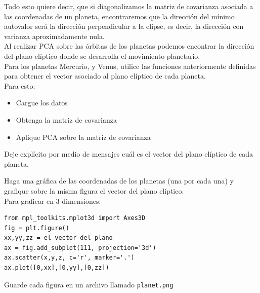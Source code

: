 \documentclass[11pt,letterpaper]{exam}
\begin{document}
\begin{questions}
Todo esto quiere decir, que si diagonalizamos la matriz de covarianza asociada a las coordenadas de un planeta, encontraremos que la direcci\'on del m\'inimo autovalor ser\'a la direcci\'on perpendicular a la elipse, es decir, la direcci\'on con varianza aproximadamente nula.\\

Al realizar PCA sobre las \'orbitas de los planetas podemos encontrar la direcci\'on del plano el\'iptico donde se desarrolla el movimiento planetario.\\

Para los planetas Mercurio, y Venus, utilice las funciones anteriormente definidas para obtener el vector asociado al plano el\'iptico de cada planeta.\\

Para esto:\\

\begin{itemize}
\item Cargue los datos
\item Obtenga la matriz de covarianza
\item Aplique PCA sobre la matriz de covarianza
\end{itemize}

Deje expl\'icito por medio de mensajes cu\'al es el vector del plano el\'iptico de cada planeta.\\


Haga una gr\'afica de las coordenadas de los planetas (una por cada una) y grafique sobre la misma figura el vector del plano el\'iptico.\\

Para graficar en 3 dimensiones:

\begin{verbatim}
from mpl_toolkits.mplot3d import Axes3D
fig = plt.figure()
xx,yy,zz = el vector del plano
ax = fig.add_subplot(111, projection='3d')
ax.scatter(x,y,z, c='r', marker='.')
ax.plot([0,xx],[0,yy],[0,zz])
\end{verbatim}

Guarde cada figura en un archivo llamado \verb"planet.png"

\end{questions}
\end{document}
